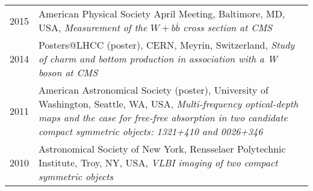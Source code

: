 \documentclass[10pt]{article} %
\begin{document}
\begin{tabulary}{0.9\textwidth}{RL}
2015 & American Physical Society April Meeting, Baltimore, MD, USA, 
 \emph{Measurement of the $W+b\overline{b}$ cross section at CMS} \\

2014 & Posters@LHCC (poster), CERN, Meyrin, Switzerland,
 \emph{Study of charm and bottom production in association with a W boson at CMS } \\

2011 & American Astronomical Society (poster), University of Washington, Seattle, WA, USA,
 \emph{Multi-frequency optical-depth maps and the case for free-free absorption 
 in two candidate compact symmetric objects: 1321+410 and 0026+346} \\

2010 & Astronomical Society of New York, Rensselaer Polytechnic Institute, Troy, NY, USA,
 \emph{VLBI imaging of two compact symmetric objects } \\
\end{tabulary}
\end{document}
